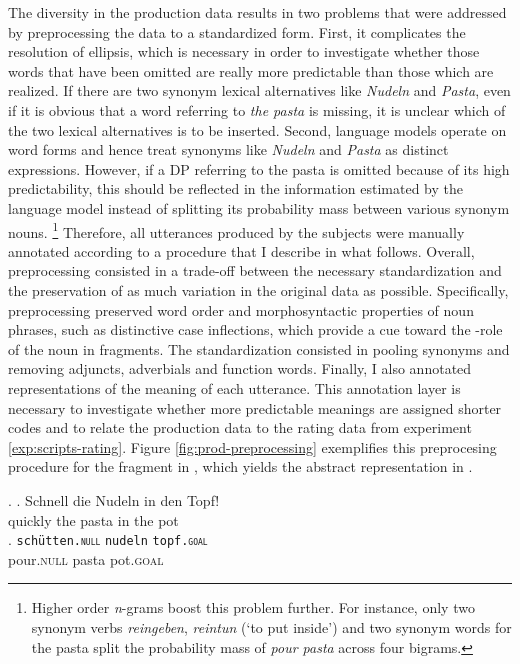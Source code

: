 The diversity in the production data results in two problems that were addressed by preprocessing the data to a standardized form. First, it complicates the resolution of ellipsis, which is necessary in order to investigate whether those words that have been omitted are really more predictable than those which are realized. If there are two synonym lexical alternatives like \textit{Nudeln} and \textit{Pasta}, even if it is obvious that a word referring to \textit{the pasta} is missing, it is unclear which of the two lexical alternatives is to be inserted. Second, language models operate on word forms and hence treat synonyms like \textit{Nudeln} and \textit{Pasta} as distinct expressions. However, if a DP referring to the pasta is omitted because of its high predictability, this should be reflected in the information estimated by the language model instead of splitting its probability mass between various synonym nouns.%
%
\footnote{Higher order \textit{n}-grams boost this problem further. For instance, only two synonym verbs \textit{reingeben}, \textit{reintun} (`to put inside') and two synonym words for the pasta split the probability mass of \textit{pour pasta} across four bigrams.}\afterfn%
%
Therefore, all utterances produced by the subjects were manually annotated according to a procedure that I describe in what follows. Overall, preprocessing consisted in a trade-off between the necessary standardization and the preservation of as much variation in the original data as possible. Specifically, preprocessing preserved word order and morphosyntactic properties of noun phrases, such as distinctive case inflections, which provide a cue toward the \texttheta-role of the noun in fragments. The standardization consisted in pooling synonyms and removing adjuncts, adverbials and function words. Finally, I also annotated representations of the meaning of each utterance. This annotation layer is necessary to investigate whether more predictable meanings are assigned shorter codes and to relate the production data to the rating data from experiment \ref{exp:scripts-rating}. Figure \ref{fig:prod-preprocessing} exemplifies this preprocesing procedure for the fragment in \Next[a], which yields the abstract representation in \Next[b].

\ex. \ag. Schnell die Nudeln in den Topf!\\
	  quickly the pasta in the pot\\
     \bg. \texttt{schütten.\textsc{null}} \texttt{nudeln} \texttt{topf.\textsc{goal}}\\
	pour.\textsc{null} pasta pot.\textsc{goal}\\

